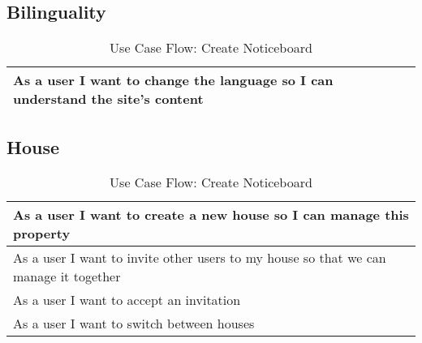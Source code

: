\subsection{Bilinguality}
\begin{table}[H]
  \begin{tabularx}{\linewidth}{|X|}
    \hline
      As a user I want to change the language so I can understand the site's content \\
     \hline
  \end{tabularx}
  \caption{Use Case Flow: Create Noticeboard}
\end{table}

\subsection{House}
\begin{table}[H]
  \begin{tabularx}{\linewidth}{|X|}
    \hline
      As a user I want to create a new house so I can manage this property \\
     \hline
      As a user I want to invite other users to my house so that we can manage it together \\
     \hline
      As a user I want to accept an invitation \\
     \hline
      As a user I want to switch between houses \\
     \hline 
  \end{tabularx}
  \caption{Use Case Flow: Create Noticeboard}
\end{table}
